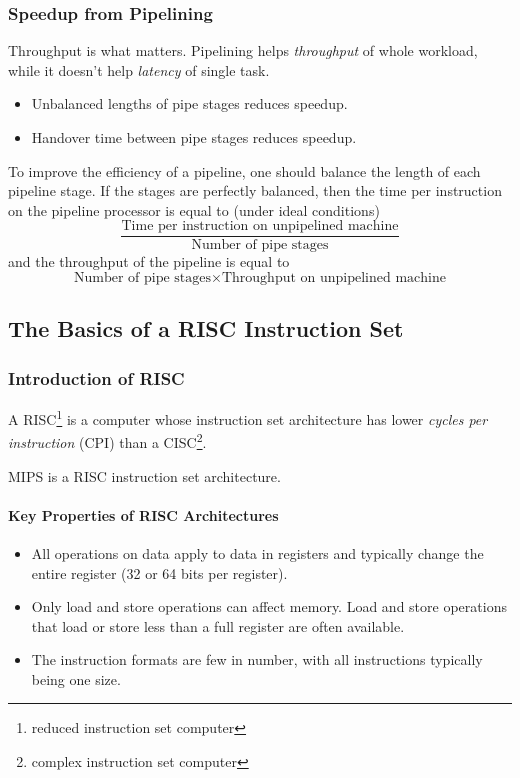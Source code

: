 \documentclass[12pt, a4paper]{article}
\theoremstyle{margin}
\begin{document}
	\subsubsection{Speedup from Pipelining}

	  \indent 

	  Throughput is what matters. Pipelining helps \emph{throughput} of whole workload, while it doesn't help \emph{latency} of single task. 

	  \begin{itemize}
		\item Unbalanced lengths of pipe stages reduces speedup. 
		\item Handover time between pipe stages reduces speedup.
	  \end{itemize}

	  To improve the efficiency of a pipeline, one should balance the length of each pipeline stage. If the stages are perfectly balanced, then the time per instruction on the pipeline processor is equal to (under ideal conditions) 
	  $$\frac{\text{Time per instruction on unpipelined machine}}{\text{Number of pipe stages}}$$ 
	  and the throughput of the pipeline is equal to 
	  $$\text{Number of pipe stages} \times \text{Throughput on unpipelined machine}$$

  \subsection{The Basics of a RISC Instruction Set}

	\subsubsection{Introduction of RISC}

	  \indent 

	  A RISC\footnote{reduced instruction set computer} is a computer whose instruction set architecture has lower \emph{cycles per instruction} (CPI) than a CISC\footnote{complex instruction set computer}.

	  MIPS is a RISC instruction set architecture.

	  \paragraph{Key Properties of RISC Architectures\cite{caqa}}
		\begin{itemize}
		  \item All operations on data apply to data in registers and typically change the entire register (32 or 64 bits per register).
		  \item Only load and store operations can affect memory. Load and store operations that load or store less than a full register are often available.
		  \item The instruction formats are few in number, with all instructions typically being one size.
		\end{itemize}
\end{document}
